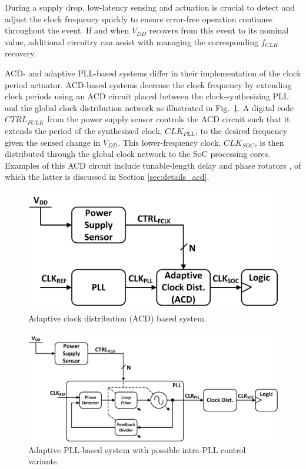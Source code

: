 \documentclass[twoside,9pt,journal,letterpage]{IEEEtran}
\begin{document}
During a supply drop, low-latency sensing and actuation is crucial to detect and adjust the clock frequency quickly to ensure error-free operation continues throughout the event. If and when $V_{DD}$ recovers from this event to its nominal value, additional circuitry can assist with managing the corresponding $f_{CLK}$ recovery.

ACD- and adaptive PLL-based systems differ in their implementation of the clock period actuator. ACD-based systems decrease the clock frequency by extending clock periods using an ACD circuit placed between the clock-synthesizing PLL and the global clock distribution network as illustrated in Fig.\ \ref{fig:overview_acd}. A digital code $CTRL_{FCLK}$ from the power supply sensor controls the ACD circuit such that it extends the period of the synthesized clock, $CLK_{PLL}$, to the desired frequency given the sensed change in $V_{DD}$. This lower-frequency clock, $CLK_{SOC}$, is then distributed through the global clock network to the SoC processing cores. Examples of this ACD circuit include tunable-length delay \cite{bowman2016} and phase rotators \cite{wilcox2015}, of which the latter is discussed in Section \ref{sec:details_acd}.

\begin{figure}[h]
	\centering
	\includegraphics[width=0.7\columnwidth]{fig_overview_acd}
	\caption{Adaptive clock distribution (ACD) based system.}
	\label{fig:overview_acd}
\end{figure}

\begin{figure}[h]
	\centering
	\includegraphics[width=\columnwidth]{fig_overview_pll}
	\caption{Adaptive PLL-based system with possible intra-PLL control variants.}
	\label{fig:overview_pll}
\end{figure}
\end{document}
